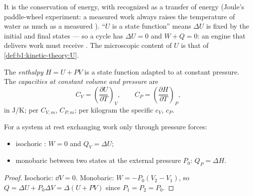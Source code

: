 \begin{remark}\label{rem:b1:first-law:meaning}
It is the conservation of energy, with  recognized as a transfer of
energy (Joule's paddle-wheel experiment: a measured work always raises
the temperature of water as much as a measured ). ``$U$ is a state
function'' means $\Delta U$ is fixed by the initial and final states ---
so a cycle has $\Delta U = 0$ and $W + Q = 0$: an engine that delivers
work must receive . The microscopic content of $U$ is that of
\cref{def:b1:kinetic-theory:U}.
\end{remark}

\begin{definition}\label{def:b1:first-law:enthalpy}
The \emph{enthalpy} $H = U + PV$ is a state function adapted to
 at constant pressure. The \emph{ capacities at
constant volume and pressure} are
\[
C_V = \left(\frac{\partial U}{\partial T}\right)_V, \qquad
C_P = \left(\frac{\partial H}{\partial T}\right)_P ,
\]
in \unit{J/K}; per  $C_{V,m}$, $C_{P,m}$; per kilogram the specific
 $c_V$, $c_P$.
\end{definition}

\begin{proposition}\label{prop:b1:first-law:qvqp}
For a system at rest exchanging work only through pressure forces:
\begin{itemize}
  \item isochoric : $W = 0$ and $Q_V = \Delta U$;
  \item monobaric  between two states at the external
        pressure $P_0$: $Q_P = \Delta H$.
\end{itemize}
\end{proposition}

\begin{proof}
Isochoric: $\dd V = 0$. Monobaric: $W = -P_0(V_2 - V_1)$, so $Q = \Delta U +
P_0\Delta V = \Delta(U + PV)$ since $P_1 = P_2 = P_0$.
\end{proof}

